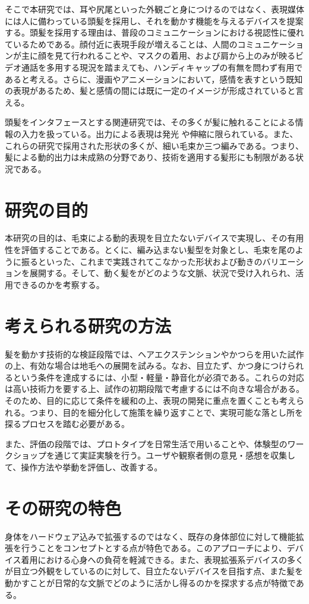 \documentclass[a4paper]{jsarticle}
\begin{document}
そこで本研究では、耳や尻尾といった外観ごと身につけるのではなく、表現媒体には人に備わっている頭髪を採用し、それを動かす機能を与えるデバイスを提案する。頭髪を採用する理由は、普段のコミュニケーションにおける視認性に優れているためである。顔付近に表現手段が増えることは、人間のコミュニケーションが主に顔を見て行われることや、マスクの着用、および肩から上のみが映るビデオ通話を多用する現況を踏まえても、ハンディキャップの有無を問わず有用であると考える。さらに、漫画やアニメーションにおいて，感情を表すという既知の表現があるため、髪と感情の間には既に一定のイメージが形成されていると言える。

頭髪をインタフェースとする関連研究では、その多くが髪に触れることによる情報の入力を扱っている\cite{smartWig}\cite{Hairware}\cite{HairIO}。出力による表現は発光\cite{LH} \cite{VariWig}や伸縮\cite{HairIO}に限られている。また、これらの研究で採用された形状の多くが、細い毛束か三つ編みである。つまり、髪による動的出力は未成熟の分野であり、技術を適用する髪形にも制限がある状況である。

\section{研究の目的} 
本研究の目的は、毛束による動的表現を目立たないデバイスで実現し、その有用性を評価することである。とくに、編み込まない髪型を対象とし、毛束を尾のように振るといった、これまで実践されてこなかった形状および動きのバリエーションを展開する。そして、動く髪をがどのような文脈、状況で受け入れられ、活用できるのかを考察する。

\section{考えられる研究の方法} 
髪を動かす技術的な検証段階では、ヘアエクステンションやかつらを用いた試作の上、有効な場合は地毛への展開を試みる。なお、目立たず、かつ身につけられるという条件を達成するには、小型・軽量・静音化が必須である。これらの対応は高い技術力を要する上、試作の初期段階で考慮するには不向きな場合がある。そのため、目的に応じて条件を緩和の上、表現の開発に重点を置くことも考えられる。つまり、目的を細分化して施策を繰り返すことで、実現可能な落とし所を探るプロセスを踏む必要がある。

また、評価の段階では、プロトタイプを日常生活で用いることや、体験型のワークショップを通じて実証実験を行う。ユーザや観察者側の意見・感想を収集して、操作方法や挙動を評価し、改善する。

\section{その研究の特色}
身体をハードウェア込みで拡張するのではなく、既存の身体部位に対して機能拡張を行うことをコンセプトとする点が特色である。このアプローチにより、デバイス着用における心身への負荷を軽減できる。また、表現拡張系デバイスの多くが目立つ外観をしているのに対して、目立たないデバイスを目指す点、また髪を動かすことが日常的な文脈でどのように活かし得るのかを探求する点が特徴である。
\end{document}
